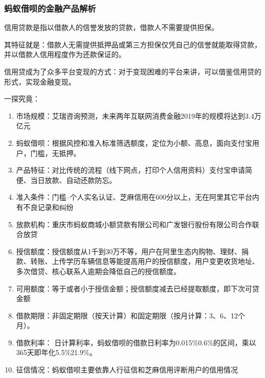 \documentclass[letterpaper,11pt,english]{sphinxmanual}
\begin{document}
\subsubsection{蚂蚁借呗的金融产品解析}
\label{\detokenize{chapter_experience/ant_jiebei:id1}}\label{\detokenize{chapter_experience/ant_jiebei::doc}}
信用贷款是指以借款人的信誉发放的贷款，借款人不需要提供担保。

其特征就是：借款人无需提供抵押品或第三方担保仅凭自己的信誉就能取得贷款，并以借款人信用程度作为还款保证的。

信用贷成为了众多平台变现的方式：对于变现困难的平台来讲，可以借鉴信用贷的形式，实现金融变现。

一探究竟：
\begin{enumerate}
%
\item {} 
市场规模：艾瑞咨询预测，未来两年互联网消费金融2019年的规模将达到3.4万亿元

\item {} 
蚂蚁借呗：根据风控和准入标准筛选额度，定位为小额、高息，面向支付宝用户，门槛，无抵押。

\item {} 
产品特征：对比传统的流程（线下网点，打印个人信用资料）支付宝申请简便、当日放款、自动还款防忘。

\item {} 
准入条件：门槛–个人实名认证、芝麻信用在600分以上，无在阿里其它平台内有不良记录和纠纷

\item {} 
放款机构：重庆市蚂蚁商城小额贷款有限公司和广发银行股份有限公司合作联合放贷

\item {} 
授信额度：授信额度从1千到30万不等，用户在阿里生态内购物、理财、捐款、转账、上传学历车辆信息等能提高用户的授信额度，用户变更收货地址、多次借贷、核心联系人逾期会降低自己的授信额度。

\item {} 
可用额度：等于或者小于授信金额；授信额度减去已经提取额度，即下次可贷金额

\item {} 
借款期限：非固定期限（按天计算）和固定期限（按月计算：3、6、12个月）。

\item {} 
借款利率：
日计算利率，蚂蚁借呗的借款日利率为0.015\%\sphinxhyphen{}0.6\%的区间，乘以365天即年化5.5\%\sphinxhyphen{}21.9\%。

\item {} 
征信情况：蚂蚁借呗主要依靠人行征信和芝麻信用评断用户的信用情况


\end{enumerate}
\end{document}
